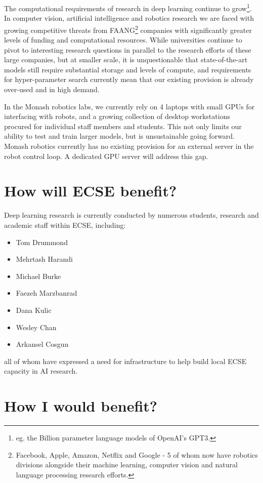 \documentclass[12pt]{texMemo} %
\begin{document}
The computational requirements of research in deep learning continue to grow\footnote{eg. the Billion parameter language models of OpenAI's GPT3.}. In computer vision, artificial intelligence and robotics research we are faced with growing competitive threats from FAANG\footnote{Facebook, Apple, Amazon, Netflix and Google - 5 of whom now have robotics divisions alongside their machine learning, computer vision and natural language processing research efforts.} companies with significantly greater levels of funding and computational resources. While universities continue to pivot to interesting research questions in parallel to the research efforts of these large companies, but at smaller scale, it is unquestionable that state-of-the-art models still require substantial storage and levels of compute, and requirements for hyper-parameter search currently mean that our existing provision is already over-used and in high demand.

In the Monash robotics labs, we currently rely on 4 laptops with small GPUs for interfacing with robots, and a growing collection of desktop workstations procured for individual staff members and students. This not only limits our ability to test and train larger models, but is unsustainable going forward. Monash robotics currently has no existing provision for an external server in the robot control loop. A dedicated GPU server will address this gap.

\section{How will ECSE benefit?}

Deep learning research is currently conducted by numerous students, research and academic staff within ECSE, including:
\begin{itemize}
    \item Tom Drummond
    \item Mehrtash Harandi
    \item Michael Burke
    \item Faezeh Marzbanrad
    \item Dana Kulic
    \item Wesley Chan
    \item Arkansel Cosgun
\end{itemize}
all of whom have expressed a need for infrastructure to help build local ECSE capacity in AI research. 

\section{How I would benefit?}
\end{document}
